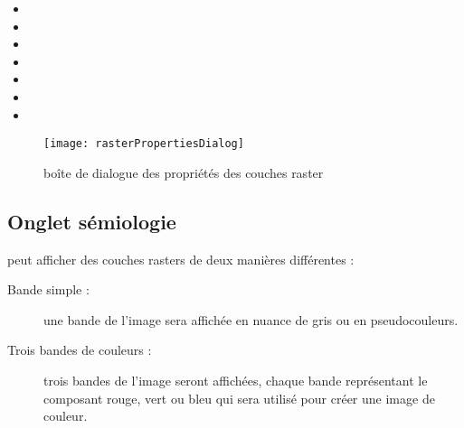\begin{itemize}[label=--]
 \item {}
 \item {}
 \item {}
 \item {}
 \item {}
 \item {}
 \item {}
\end{itemize}

\begin{figure}[htb]
  \begin{center}
   
   \texttt{[image: rasterPropertiesDialog]}
   \caption{boîte de dialogue des propriétés des couches raster
\nixcaption}\label{fig:raster_properties}
\end{center}
\end{figure}

\subsection{Onglet sémiologie}\label{label_sombology}

\qg peut afficher des couches rasters de deux manières différentes
:

\begin{description}
\item[Bande simple :] une bande de l'image sera affichée en nuance de gris ou en pseudocouleurs.
\item[Trois bandes de couleurs :] trois bandes de l'image seront affichées,
chaque bande représentant le composant rouge, vert ou bleu qui sera utilisé pour créer une image de couleur.
\end{description}

